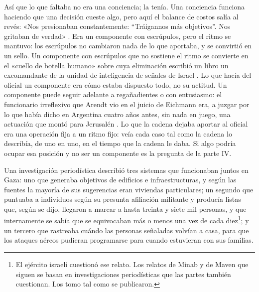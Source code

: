 Así que lo que faltaba no era una conciencia; la tenía. Una conciencia funciona haciendo que una decisión cueste algo, pero aquí el balance de costos salía al revés: «Nos presionaban constantemente: “Tráigannos más objetivos”. Nos gritaban de verdad» \autocite{abraham2024lavender}. Era un componente con escrúpulos, pero el ritmo se mantuvo: los escrúpulos no cambiaron nada de lo que aportaba, y se convirtió en un sello. Un componente con escrúpulos que no sostiene el ritmo se convierte en el «cuello de botella humano» sobre cuya eliminación escribió un libro un excomandante de la unidad de inteligencia de señales de Israel \autocite{ys2021humanmachine}. Lo que hacía del oficial un componente era cómo estaba dispuesto todo, no su actitud. Un componente puede seguir adelante a regañadientes o con entusiasmo: el funcionario irreflexivo que Arendt vio en el juicio de Eichmann \autocite{arendt1963eichmann} era, a juzgar por lo que había dicho en Argentina cuatro años antes, sin nada en juego, una actuación que montó para Jerusalén \autocite{stangneth2014eichmann}. Lo que la cadena dejaba aportar al oficial era una operación fija a un ritmo fijo: veía cada caso tal como la cadena lo describía, de uno en uno, en el tiempo que la cadena le daba. Si algo podría ocupar esa posición y no ser un componente es la pregunta de la parte IV.

Una investigación periodística describió tres sistemas que funcionaban juntos en Gaza: uno que generaba objetivos de edificios e infraestructuras, y según las fuentes la mayoría de sus sugerencias eran viviendas particulares; un segundo que puntuaba a individuos según su presunta afiliación militante y producía listas que, según se dijo, llegaron a marcar a hasta treinta y siete mil personas, y que internamente se sabía que se equivocaban más o menos una vez de cada diez\footnote{El ejército israelí cuestionó ese relato. Los relatos de Minab y de Maven que siguen se basan en investigaciones periodísticas que las partes también cuestionan. Los tomo tal como se publicaron.}; y un tercero que rastreaba cuándo las personas señaladas volvían a casa, para que los ataques aéreos pudieran programarse para cuando estuvieran con sus familias.


